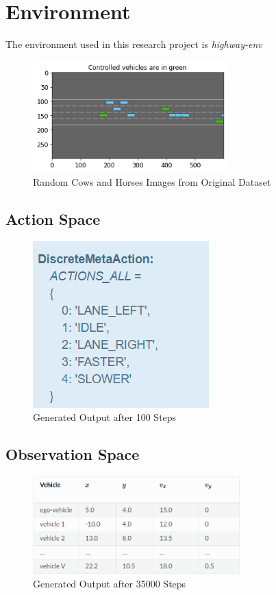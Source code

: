 \documentclass[conference]{IEEEtran}
\begin{document}
\section{Environment}
The environment used in this research project is \textit{highway-env}
\begin{figure}
\centerline{\includegraphics[width=75mm]{images/highway-env.png}}
\caption{Random Cows and Horses Images from Original Dataset}\label{fig1}
\end{figure}

\subsection{Action Space}

\begin{figure}
\centerline{\includegraphics[width=0.3\linewidth]{images/action_space.png}}
\caption{Generated Output after 100 Steps}
\label{fig2}
\end{figure}

\subsection{Observation Space}

\begin{figure}
\centerline{\includegraphics[width=80mm]{images/observation_space.png}}
\caption{Generated Output after 35000 Steps}
\label{fig3}
\end{figure}
\end{document}
